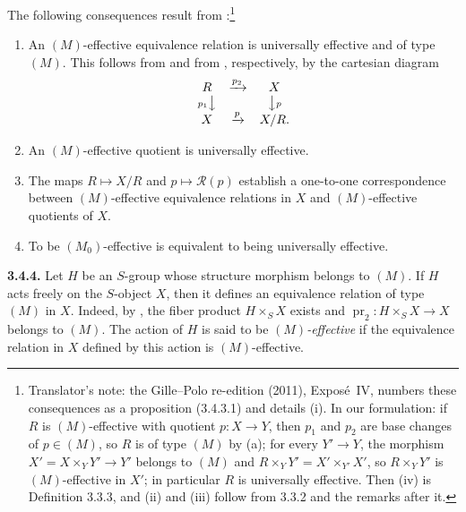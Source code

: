 The following consequences result from :\footnote{Translator's note: the Gille--Polo re-edition (2011), Expos\'e~IV, numbers
these consequences as a proposition (3.4.3.1) and details (i). In our
formulation: if \(R\) is \((M)\)-effective with quotient \(p\colon X\to Y\),
then \(p_1\) and \(p_2\) are base changes of \(p\in(M)\), so \(R\) is of type
\((M)\) by (a); for every \(Y'\to Y\), the morphism \(X'=X\times_YY'\to Y'\)
belongs to \((M)\) and \(R\times_YY'=X'\times_{Y'}X'\), so \(R\times_YY'\) is
\((M)\)-effective in \(X'\); in particular \(R\) is universally effective.
Then (iv) is Definition 3.3.3, and (ii) and (iii) follow from 3.3.2 and the
remarks after it.}
%
\begin{enumerate}
  \item[(i)] An \((M)\)-effective equivalence relation is universally
  effective and of type \((M)\). This follows from  and from ,
  respectively, by the cartesian diagram
  \[
    \begin{array}{ccc}
      R & \xrightarrow{p_2} & X\\
      {\scriptstyle p_1}\big\downarrow && \big\downarrow{\scriptstyle p}\\
      X & \xrightarrow{p} & X/R.
    \end{array}
  \]
  \item[(ii)] An \((M)\)-effective quotient is universally effective.
  \item[(iii)] The maps \(R\mapsto X/R\) and \(p\mapsto\mathscr R(p)\)
  establish a one-to-one correspondence between \((M)\)-effective
  equivalence relations in \(X\) and \((M)\)-effective quotients of \(X\).
  \item[(iv)] To be \((M_0)\)-effective is equivalent to being universally
  effective.
\end{enumerate}

\medskip
\noindent{}\textbf{3.4.4.}
Let \(H\) be an \(S\)-group whose structure morphism belongs to \((M)\). If
\(H\) acts freely on the \(S\)-object \(X\), then it defines an equivalence
relation of type \((M)\) in \(X\). Indeed, by , the fiber product
\(H\times_S X\) exists and
\(\operatorname{pr}_2:H\times_S X\to X\) belongs to \((M)\). The action of
\(H\) is said to be \emph{\((M)\)-effective} if the equivalence relation in
\(X\) defined by this action is \((M)\)-effective.

